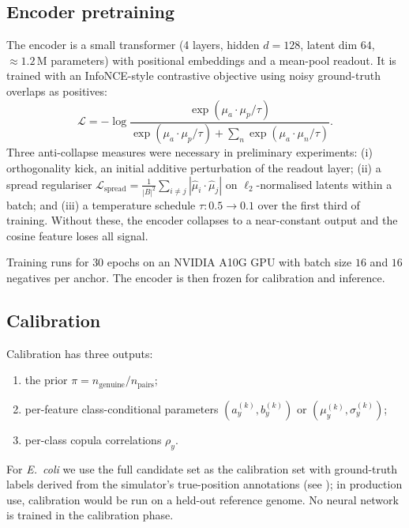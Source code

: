 \documentclass[11pt]{article}
\begin{document}
\subsection{Encoder pretraining}
\label{sec:encoder}

The encoder is a small transformer (4 layers, hidden $d=128$, latent dim
$64$, $\approx 1.2$\,M parameters) with positional embeddings and a mean-pool
readout. It is trained with an InfoNCE-style contrastive objective using
noisy ground-truth overlaps as positives:
\begin{equation}
    \mathcal{L} = -\log \frac{\exp(\mu_a \cdot \mu_p / \tau)}{\exp(\mu_a \cdot \mu_p / \tau) + \sum_{n} \exp(\mu_a \cdot \mu_n / \tau)}.
\end{equation}
Three anti-collapse measures were necessary in preliminary experiments:
(i) orthogonality kick, an initial additive perturbation of the readout
layer; (ii) a spread regulariser
$\mathcal{L}_{\text{spread}} = \frac{1}{|B|^2}\sum_{i \ne j} |\hat\mu_i \cdot \hat\mu_j|$
on $\ell_2$-normalised latents within a batch; and (iii) a temperature
schedule $\tau: 0.5 \to 0.1$ over the first third of training. Without
these, the encoder collapses to a near-constant output and the cosine
feature loses all signal.

Training runs for $30$ epochs on an NVIDIA A10G GPU with batch size $16$
and $16$ negatives per anchor. The encoder is then frozen for calibration
and inference.

\subsection{Calibration}
\label{sec:calibration}

Calibration has three outputs:
\begin{enumerate}
    \item the prior $\pi = n_{\text{genuine}}/n_{\text{pairs}}$;
    \item per-feature class-conditional parameters
    $(a_y^{(k)}, b_y^{(k)})$ or $(\mu_y^{(k)}, \sigma_y^{(k)})$;
    \item per-class copula correlations $\rho_y$.
\end{enumerate}

For \textit{E.\ coli} we use the full candidate set as the calibration set
with ground-truth labels derived from the simulator's true-position
annotations (see ); in production use, calibration would be
run on a held-out reference genome. No neural network is trained in the
calibration phase.
\end{document}
